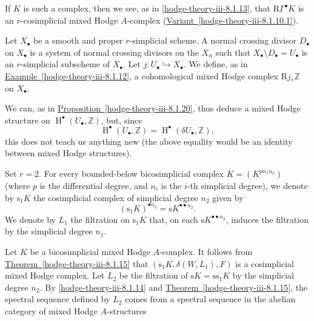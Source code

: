     If \(K\) is such a complex, then we see, as in \cref{hodge-theory-iii-8.1.13}, that \(\mathrm {R}\Gamma ^\bullet  K\) is an \(r\)-cosimplicial mixed Hodge \(A\)-complex (\hyperref[hodge-theory-iii-8.1.10.1]{Variant~\ref*{hodge-theory-iii-8.1.10.1}}).\par{}Let \(X_\bullet \) be a smooth and proper \(r\)-simplicial scheme.
    A normal crossing divisor \(D_\bullet \) on \(X_\bullet \) is a system of normal crossing divisors on the \(X_n\) such that \(X_\bullet \setminus  D_\bullet =U_\bullet \) is an \(r\)-simplicial subscheme of \(X_\bullet \).
    Let \(j\colon  U_\bullet \hookrightarrow  X_\bullet \).
    We define, as in \hyperref[hodge-theory-iii-8.1.12]{Example~\ref*{hodge-theory-iii-8.1.12}}, a cohomological mixed Hodge complex \(\mathrm {R} j_*\mathbb {Z}\) on \(X_\bullet \).\par{}We can, as in \hyperref[hodge-theory-iii-8.1.20]{Proposition~\ref*{hodge-theory-iii-8.1.20}}, thus deduce a mixed Hodge structure on \(\operatorname {H}^\bullet (U_\bullet ,\mathbb {Z})\), but, since
    \[       \operatorname {H}^\bullet (U_\bullet ,\mathbb {Z})       = \operatorname {H}^\bullet (\delta  U_\bullet ,\mathbb {Z}),     \]
    this does not teach us anything new (the above equality would be an identity between mixed Hodge structures).\label{hodge-theory-iii-8.1.22}\par{}Set \(r=2\).
    For every bounded-below bicosimplicial complex \(K=(K^{pn_1n_2})\) (where \(p\) is the differential degree, and \(n_i\) is the \(i\)-th simplicial degree), we denote by \(\mathrm {s}_1K\) the cosimplicial complex of simplicial degree \(n_2\) given by
    \[       (\mathrm {s}_1K)^{\bullet  n_2}       = \mathrm {s} K^{\bullet \bullet  n_2}.     \]
    We denote by \(L_1\) the filtration on \(\mathrm {s}_1K\) that, on each \(\mathrm {s} K^{\bullet \bullet  n_2}\), induces the filtration by the simplicial degree \(n_1\).\par{}Let \(K\) be a bicosimplicial mixed Hodge \(A\)-complex.
    It follows from \hyperref[hodge-theory-iii-8.1.15]{Theorem~\ref*{hodge-theory-iii-8.1.15}} that \((\mathrm {s}_1K,\delta (W,L_1),F)\) is a cosimplicial mixed Hodge complex.
    Let \(L_2\) be the filtration of \(\mathrm {s} K=\mathrm {s}\mathrm {s}_1K\) by the simplicial degree \(n_2\).
    By \cref{hodge-theory-iii-8.1.14} and \hyperref[hodge-theory-iii-8.1.15]{Theorem~\ref*{hodge-theory-iii-8.1.15}}, the spectral sequence defined by \(L_2\) comes from a spectral sequence in the abelian category of mixed Hodge \(A\)-structures

